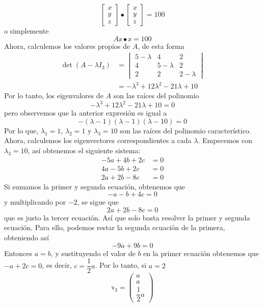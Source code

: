 \begin{example}
$$\begin{bmatrix}
        x \\
        y \\
        z
    \end{bmatrix} \bullet \begin{bmatrix}
        x \\
        y \\
        z
    \end{bmatrix} = 100$$
    o simplemente
    $$A \mathbb{x} \bullet \mathbb{x} = 100$$
    Ahora, calculemos los valores propios de $A$, de esta forma
    \begin{align*}
        \operatorname{det} (A - \lambda I_3) & = \begin{vmatrix}
            5 - \lambda & 4 & 2 \\
            4 & 5 - \lambda & 2 \\
            2 & 2 & 2 - \lambda
        \end{vmatrix} \\
        & = - \lambda^3 + 12\lambda^2 - 21\lambda + 10
    \end{align*}\newpage\noindent
    Por lo tanto, los eigenvalores de $A$ son las raíces del polinomio
    $$- \lambda^3 + 12\lambda^2 - 21\lambda + 10 = 0$$
    pero observemos que la anterior expresión es igual a
    $$-(\lambda - 1)(\lambda - 1)(\lambda - 10) = 0$$
    Por lo que, $\lambda_1 = 1$, $\lambda_2 = 1$ y $\lambda_3 = 10$ son las raíces del polinomio característico. Ahora, calculemos los eigenvectores correspondientes a cada $\lambda$. Empecemos con $\lambda_3 = 10$, así obtenemos el siguiente sistema:
    \begin{align*}
        - 5a + 4b + 2c & = 0 \\
        4a - 5b + 2c & = 0 \\
        2a + 2b - 8c & = 0
    \end{align*}
    Si sumamos la primer y segunda ecuación, obtenemos que
    $$-a - b + 4c = 0$$
    y multiplicando por $-2$, se sigue que
    $$2a + 2b - 8c = 0$$
    que es justo la tercer ecuación. Así que solo basta resolver la primer y segunda ecuación. Para ello, podemos restar la segunda ecuación de la primera, obteniendo así
    $$-9a + 9b = 0$$
    Entonces $a = b$, y sustituyendo el valor de $b$ en la primer ecuación obtenemos que $-a + 2c = 0$, es decir, $c = \dfrac{1}{2}a$. Por lo tanto, si $a = 2$
    $$\mathbb{v}_3 = \begin{pmatrix}
        a \\
        a \\[2mm]
        \dfrac{1}{2}a

\end{pmatrix}$$
\end{example}
